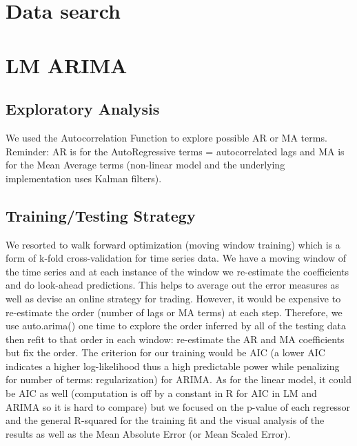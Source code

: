 \documentclass{article}
\begin{document}
	\section{Data search}
	
	\section{LM ARIMA}
		\subsection{Exploratory Analysis}
		We used the Autocorrelation Function to explore possible AR or MA terms. Reminder: AR is for the AutoRegressive terms = autocorrelated lags and MA is for the Mean Average terms (non-linear model and the underlying implementation uses Kalman filters).
	
		\subsection{Training/Testing Strategy}
	We resorted to walk forward optimization (moving window training) which is a form of k-fold cross-validation for time series data. We have a moving window of the time series and at each instance of the window we re-estimate the coefficients and do look-ahead predictions. This helps to average out the error measures as well as devise an online strategy for trading.
	However, it would be expensive to re-estimate the order (number of lags or MA terms) at each step. Therefore, we use auto.arima() one time to explore the order inferred by all of the testing data then refit to that order in each window: re-estimate the AR and MA coefficients but fix the order. 
	The criterion for our training would be AIC (a lower AIC indicates a higher log-likelihood thus a high predictable power while penalizing for number of terms: regularization) for ARIMA. As for the linear model, it could be AIC as well (computation is off by a constant in R for AIC in LM and ARIMA so it is hard to compare) but we focused on the p-value of each regressor and the general R-squared for the training fit and the visual analysis of the results as well as the Mean Absolute Error (or Mean Scaled Error).
	
	\includegraphics[width=0.5]{ACF.PNG}
\end{document}
